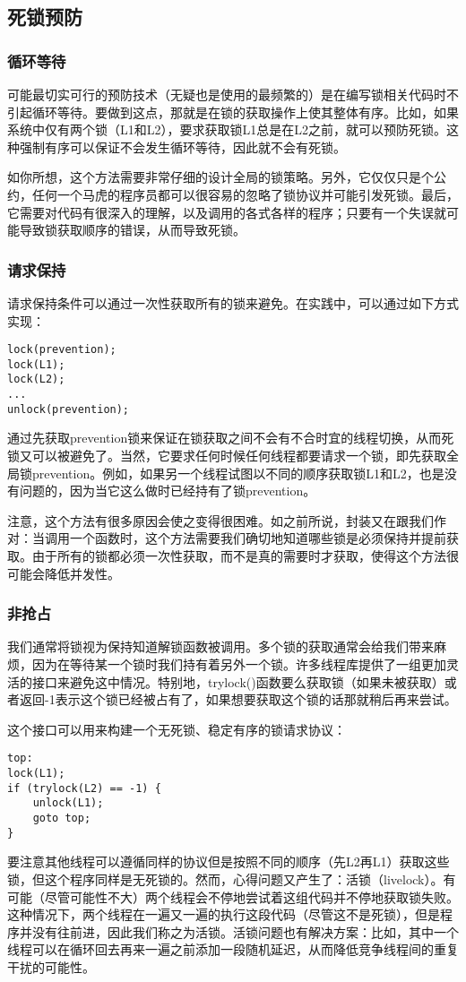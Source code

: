 \subsection{死锁预防}

\subsubsection*{循环等待}
可能最切实可行的预防技术（无疑也是使用的最频繁的）是在编写锁相关代码时不引起循环等待。要做到这点，那就是在锁的获取操作上使其整体有序。比如，如果系统中仅有两个锁（L1和L2），要求获取锁L1总是在L2之前，就可以预防死锁。这种强制有序可以保证不会发生循环等待，因此就不会有死锁。

如你所想，这个方法需要非常仔细的设计全局的锁策略。另外，它仅仅只是个公约，任何一个马虎的程序员都可以很容易的忽略了锁协议并可能引发死锁。最后，它需要对代码有很深入的理解，以及调用的各式各样的程序；只要有一个失误就可能导致锁获取顺序的错误，从而导致死锁。

\subsubsection*{请求保持}
请求保持条件可以通过一次性获取所有的锁来避免。在实践中，可以通过如下方式实现：
\begin{verbatim}
lock(prevention);
lock(L1);
lock(L2);
...
unlock(prevention);
\end{verbatim}
通过先获取prevention锁来保证在锁获取之间不会有不合时宜的线程切换，从而死锁又可以被避免了。当然，它要求任何时候任何线程都要请求一个锁，即先获取全局锁prevention。例如，如果另一个线程试图以不同的顺序获取锁L1和L2，也是没有问题的，因为当它这么做时已经持有了锁prevention。

注意，这个方法有很多原因会使之变得很困难。如之前所说，封装又在跟我们作对：当调用一个函数时，这个方法需要我们确切地知道哪些锁是必须保持并提前获取。由于所有的锁都必须一次性获取，而不是真的需要时才获取，使得这个方法很可能会降低并发性。

\subsubsection*{非抢占}
我们通常将锁视为保持知道解锁函数被调用。多个锁的获取通常会给我们带来麻烦，因为在等待某一个锁时我们持有着另外一个锁。许多线程库提供了一组更加灵活的接口来避免这中情况。特别地，trylock()函数要么获取锁（如果未被获取）或者返回-1表示这个锁已经被占有了，如果想要获取这个锁的话那就稍后再来尝试。

这个接口可以用来构建一个无死锁、稳定有序的锁请求协议：
\begin{verbatim}
top:
lock(L1);
if (trylock(L2) == -1) {
    unlock(L1);
    goto top;
}
\end{verbatim}
要注意其他线程可以遵循同样的协议但是按照不同的顺序（先L2再L1）获取这些锁，但这个程序同样是无死锁的。然而，心得问题又产生了：活锁（livelock）。有可能（尽管可能性不大）两个线程会不停地尝试着这组代码并不停地获取锁失败。这种情况下，两个线程在一遍又一遍的执行这段代码（尽管这不是死锁），但是程序并没有往前进，因此我们称之为活锁。活锁问题也有解决方案：比如，其中一个线程可以在循环回去再来一遍之前添加一段随机延迟，从而降低竞争线程间的重复干扰的可能性。

